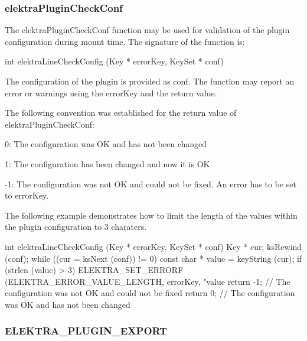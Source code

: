 \subsubsection*{elektra\+Plugin\+Check\+Conf}

The {\ttfamily elektra\+Plugin\+Check\+Conf} function may be used for validation of the plugin configuration during mount time. The signature of the function is\+: \begin{DoxyVerb}    int elektraLineCheckConfig (Key * errorKey, KeySet * conf)
\end{DoxyVerb}


The configuration of the plugin is provided as {\ttfamily conf}. The function may report an error or warnings using the {\ttfamily error\+Key} and the return value.

The following convention was established for the return value of {\ttfamily elektra\+Plugin\+Check\+Conf}\+:


\begin{DoxyItemize}
\item 0\+: The configuration was O\+K and has not been changed
\item 1\+: The configuration has been changed and now it is O\+K
\item -\/1\+: The configuration was not O\+K and could not be fixed. An error has to be set to error\+Key.
\end{DoxyItemize}

The following example demonstrates how to limit the length of the values within the plugin configuration to 3 charaters. \begin{DoxyVerb}    int elektraLineCheckConfig (Key * errorKey, KeySet * conf)
    {
            Key * cur;
            ksRewind (conf);
            while ((cur = ksNext (conf)) != 0)
            {
                    const char * value = keyString (cur);
                    if (strlen (value) > 3)
                    {
                            ELEKTRA_SET_ERRORF (ELEKTRA_ERROR_VALUE_LENGTH, errorKey, "value %
                            return -1; // The configuration was not OK and could not be fixed
                    }
            }
            return 0; // The configuration was OK and has not been changed
    }
\end{DoxyVerb}


\subsubsection*{E\+L\+E\+K\+T\+R\+A\+\_\+\+P\+L\+U\+G\+I\+N\+\_\+\+E\+X\+P\+O\+R\+T}

